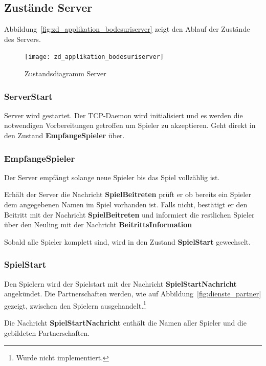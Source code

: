 \documentclass[12pt,halfparskip]{scrartcl}
\begin{document}
\subsection{Zustände Server}
\label{sub:zustände_server}

Abbildung~\vref{fig:zd_applikation_bodesuriserver} zeigt den Ablauf der Zustände des Servers.

\begin{figure}[h]
	\centering
	\texttt{[image: zd\_applikation\_bodesuriserver]}
	\caption{Zustandsdiagramm Server}
	\label{fig:zd_applikation_bodesuriserver}
\end{figure}

\subsubsection{ServerStart}
\label{ssub:serverStart}
Server wird gestartet. Der TCP-Daemon wird initialisiert und es werden die notwendigen Vorbereitungen getroffen um Spieler zu akzeptieren. Geht direkt in den Zustand \textbf{EmpfangeSpieler} über.

\subsubsection{EmpfangeSpieler}
\label{ssub:empfangespieler}
Der Server empfängt solange neue Spieler bis das Spiel vollzählig ist.

Erhält der Server die Nachricht \textbf{SpielBeitreten} prüft er ob bereits ein Spieler dem angegebenen Namen im Spiel vorhanden ist. Falls nicht, bestätigt er den Beitritt mit der Nachricht \textbf{SpielBeitreten} und informiert die restlichen Spieler über den Neuling mit der Nachricht \textbf{BeitrittsInformation}

Sobald alle Spieler komplett sind, wird in den Zustand \textbf{SpielStart} gewechselt.

\subsubsection{SpielStart}
\label{ssub:startespiel}
Den Spielern wird der Spielstart mit der Nachricht \textbf{SpielStartNachricht} angekündet. Die Partnerschaften werden, wie auf Abbildung~\vref{fig:dienste_partner} gezeigt, zwischen den Spielern ausgehandelt.\footnote{Wurde nicht implementiert.}

Die Nachricht \textbf{SpielStartNachricht} enthält die Namen aller Spieler und die gebildeten Partnerschaften.
\end{document}
